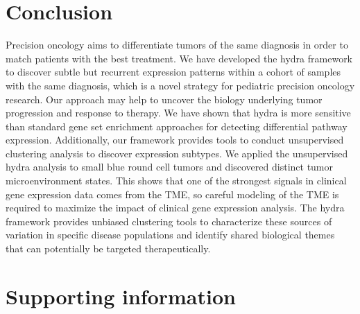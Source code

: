 \documentclass[10pt,letterpaper]{article}
\begin{document}
\section*{Conclusion}
Precision oncology aims to differentiate tumors of the same diagnosis in order to match patients with the best treatment. We have developed the hydra framework to discover subtle but recurrent expression patterns within a cohort of samples with the same diagnosis, which is a novel strategy for pediatric precision oncology research. Our approach may help to uncover the biology underlying tumor progression and response to therapy. We have shown that hydra is more sensitive than standard gene set enrichment approaches for detecting differential pathway expression. Additionally, our framework provides tools to conduct unsupervised clustering analysis to discover expression subtypes. We applied the unsupervised hydra analysis to small blue round cell tumors and discovered distinct tumor microenvironment states. This shows that one of the strongest signals in clinical gene expression data comes from the TME, so careful modeling of the TME is required to maximize the impact of clinical gene expression analysis. The hydra framework provides unbiased clustering tools to characterize these sources of variation in specific disease populations and identify shared biological themes that can potentially be targeted therapeutically.

\section*{Supporting information}

\end{document}

